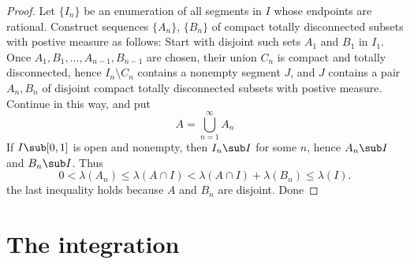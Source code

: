 \begin{proof}
Let $\{I_n\}$ be an enumeration of all segments in $I$ whose endpoints are rational. Construct sequences $\{A_n\}$, $\{B_n\}$ of compact totally disconnected subsets with postive measure as follows: Start with disjoint such sets $A_1$ and $B_1$ in $I_1$. Once $A_1,B_1,\dots,A_{n-1},B_{n-1}$ are chosen, their union $C_n$ is compact and totally disconnected, hence $I_n\setminus C_n$ contains a nonempty segment $J$, and $J$ contains a pair $A_n,B_n$ of disjoint compact totally disconnected subsets with postive measure. Continue in this way, and put
\[A=\bigcup_{n=1}^{\infty}A_n\]
If $I\sub[0,1]$ is open and nonempty, then $I_n\sub I$ for some $n$, hence $A_n\sub I$ and $B_n\sub I$. Thus
\[0<\lambda(A_n)\leq \lambda(A\cap I)<\lambda(A\cap I)+\lambda(B_n)\leq\lambda(I).\]
the last inequality holds because $A$ and $B_n$ are disjoint. Done
\end{proof}
\newpage
\chapter{The integration}
